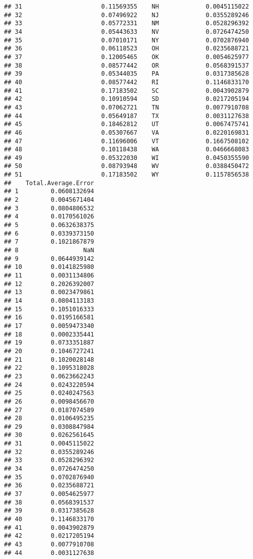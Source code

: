 \documentclass{article}\usepackage[]{graphicx}\usepackage[]{color}
\makeatletter
\newenvironment{kframe}{%
 \def\at@end@of@kframe{}%
 \ifinner\ifhmode%
  \def\at@end@of@kframe{\end{minipage}}%
  \begin{minipage}{\columnwidth}%
 \fi\fi%
 \def\FrameCommand##1{\hskip\@totalleftmargin \hskip-\fboxsep
 \colorbox{shadecolor}{##1}\hskip-\fboxsep
     \hskip-\linewidth \hskip-\@totalleftmargin \hskip\columnwidth}%
 \MakeFramed {\advance\hsize-\width
   \@totalleftmargin\z@ \linewidth\hsize
   \@setminipage}}%
 {\par\unskip\endMakeFramed%
 \at@end@of@kframe}
\newenvironment{knitrout}{}{} %
\makeatother
\begin{document}
\begin{knitrout}
\begin{kframe}
\begin{verbatim}
## 31                      0.11569355    NH             0.0045115022
## 32                      0.07496922    NJ             0.0355289246
## 33                      0.05772331    NM             0.0528296392
## 34                      0.05443633    NV             0.0726474250
## 35                      0.07010171    NY             0.0702876940
## 36                      0.06118523    OH             0.0235688721
## 37                      0.12005465    OK             0.0054625977
## 38                      0.08577442    OR             0.0568391537
## 39                      0.05344035    PA             0.0317385628
## 40                      0.08577442    RI             0.1146833170
## 41                      0.17183502    SC             0.0043902879
## 42                      0.10910594    SD             0.0217205194
## 43                      0.07062721    TN             0.0077910708
## 44                      0.05649187    TX             0.0031127638
## 45                      0.18462812    UT             0.0067475741
## 46                      0.05307667    VA             0.0220169831
## 47                      0.11696006    VT             0.1667508102
## 48                      0.10118438    WA             0.0466668083
## 49                      0.05322030    WI             0.0450355590
## 50                      0.08793948    WV             0.0388450472
## 51                      0.17183502    WY             0.1157856538
##    Total.Average.Error
## 1         0.0608132694
## 2         0.0045671404
## 3         0.0804806532
## 4         0.0170561026
## 5         0.0632638375
## 6         0.0339373150
## 7         0.1021867879
## 8                  NaN
## 9         0.0644939142
## 10        0.0141825980
## 11        0.0031134806
## 12        0.2026392007
## 13        0.0023479861
## 14        0.0804113183
## 15        0.1051016333
## 16        0.0195166581
## 17        0.0059473340
## 18        0.0002335441
## 19        0.0733351887
## 20        0.1046727241
## 21        0.1020028148
## 22        0.1095318028
## 23        0.0623662243
## 24        0.0243220594
## 25        0.0240247563
## 26        0.0098456670
## 27        0.0187074589
## 28        0.0106495235
## 29        0.0308847984
## 30        0.0262561645
## 31        0.0045115022
## 32        0.0355289246
## 33        0.0528296392
## 34        0.0726474250
## 35        0.0702876940
## 36        0.0235688721
## 37        0.0054625977
## 38        0.0568391537
## 39        0.0317385628
## 40        0.1146833170
## 41        0.0043902879
## 42        0.0217205194
## 43        0.0077910708
## 44        0.0031127638

\end{verbatim}
\end{kframe}
\end{knitrout}
\end{document}

